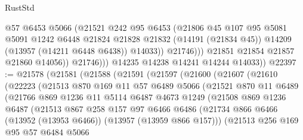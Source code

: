 \begin{lexlean}{RustStd}
\begin{coremodule}
                        @57
                        @6453
                        @5066
                        (@21521
                          @242
                          @95
                          @6453
                          (@21806
                            @45
                            @107
                            @95
                            @5081
                            @5091
                            @1242
                            @6448
                            @21824
                            @21828
                            @21832
                            (@14191 (@21834 @45))
                            @14209
                            (@13957 (@14211 @6448 @6438))
                            @14033))
                        @21746)))
                  @21851
                  @21854
                  @21857
                  @21860
                  @14056))
              @21746)))
        @14235
        @14238
        @14241
        @14244
        @14033))
@22397 := @21578
    (@21581
      (@21588
        (@21591
          (@21597
            (@21600
              (@21607
                (@21610
                  (@22223
                    (@21513
                      @870
                      @169
                      @11
                      @57
                      @6489
                      @5066
                      (@21521
                        @870
                        @11
                        @6489
                        (@21766
                          @869
                          @1236
                          @11
                          @5114
                          @6487
                          @4673
                          @1249
                          (@21508
                            @869
                            @1236
                            @6487
                            (@21513
                              @867
                              @258
                              @157
                              @97
                              @6466
                              @6486
                              (@21734
                                @866
                                @6466
                                (@13952 (@13953 @6466))
                                (@13957 (@13959 @866 @157)))
                              (@21513
                                @256
                                @169
                                @95
                                @57
                                @6484
                                @5066

\end{coremodule}
\end{lexlean}
